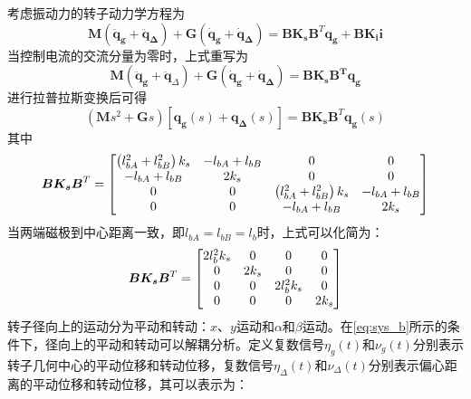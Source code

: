 \documentclass[
  lang=cn,
  degree=master,
  openany,oneside
]{nuaathesis}
\begin{document}
考虑振动力的转子动力学方程为
\begin{equation}
\boldsymbol{M} \left( { \boldsymbol{{\ddot q}_g} + \boldsymbol{{{\ddot q}}_\Delta } } \right) + \boldsymbol{G}\left( { \boldsymbol{{\dot q}_{g}} + \boldsymbol{{{\dot q}}_\Delta } } \right) = \boldsymbol{B} \boldsymbol{K_s} {{\boldsymbol{B}}^{T}} \boldsymbol{{q}_g} + \boldsymbol{B} \boldsymbol{{K}_{i}} \boldsymbol{i}
\end{equation}
当控制电流的交流分量为零时，上式重写为
\begin{equation}
\boldsymbol{M}\left( {\boldsymbol{{\ddot q}_g} + {\boldsymbol{{\ddot q}}_\Delta }} \right) + \boldsymbol{G}\left( {\boldsymbol{{\dot q}_{g}} + \boldsymbol{{{\dot q}}_\Delta }} \right) = \boldsymbol{B}\boldsymbol{K_s}\boldsymbol{{B}^{T}}\boldsymbol{{q}_g}
\end{equation}
进行拉普拉斯变换后可得
\begin{equation}
\left( {\boldsymbol{M}{s^2} + \boldsymbol{G}s} \right)\left[ {\boldsymbol{q_g}\left( s \right) + \boldsymbol{q_\Delta }\left( s \right)} \right] =  \boldsymbol{B}\boldsymbol{{K}_{s}}{{\boldsymbol{B}}^{T}}\boldsymbol{{q}_g}\left( s \right)
\end{equation}
其中
\begin{equation}
\boldsymbol{B}\boldsymbol{K_s}{{\boldsymbol{B}}^{T}} = \left[ {\begin{matrix}
   \left({ l_{bA}^2 + l_{bB}^2} \right)k_s & { - {l_{bA}} + {l_{bB}}} & 0 & 0  \cr 
   { - {l_{bA}} + {l_{bB}}} & 2k_s & 0 & 0  \cr 
   0 & 0 & \left({ l_{bA}^2 + l_{bB}^2} \right)k_s & { - {l_{bA}} + {l_{bB}}}  \cr 
   0 & 0 & { - {l_{bA}} + {l_{bB}}} & 2k_s  \cr 
 \end{matrix} } \right]
\end{equation}
当两端磁极到中心距离一致，即${l_{bA}} = {l_{bB}} = {l_b}$时，上式可以化简为：
\begin{equation}
\label{eq:sys_b}
\boldsymbol{B}\boldsymbol{K_s}{{\boldsymbol{B}}^{T}} = \left[ {\begin{matrix}
   {2l_b^2k_s} & 0 & 0 & 0  \cr 
   0 & 2k_s & 0 & 0  \cr 
   0 & 0 & {2l_b^2k_s} & 0  \cr 
   0 & 0 & 0 & 2k_s  \cr 

 \end{matrix} } \right]
\end{equation}
转子径向上的运动分为平动和转动：$x$、$y$运动和$\alpha$和$\beta$运动。在\autoref{eq:sys_b}所示的条件下，径向上的平动和转动可以解耦分析。定义复数信号$\eta _g(t)$和$\nu _g(t)$分别表示转子几何中心的平动位移和转动位移，复数信号$\eta _{\Delta}(t)$和$\nu _{\Delta}(t)$分别表示偏心距离的平动位移和转动位移，其可以表示为：
\end{document}
